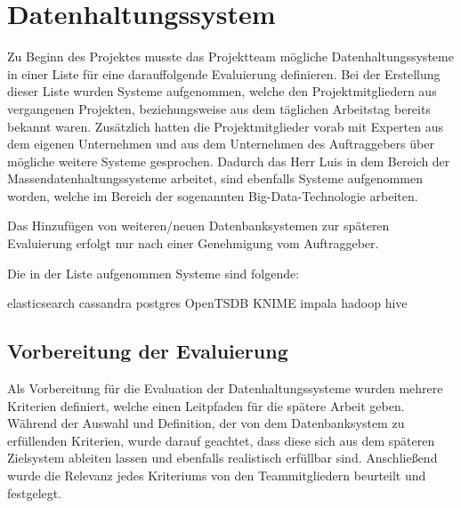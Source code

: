 \section{Datenhaltungssystem}
\label{sec:datenhaltungssystem}
Zu Beginn des Projektes musste das Projektteam mögliche Datenhaltungssysteme in
einer Liste für eine darauffolgende Evaluierung definieren. Bei der Erstellung
dieser Liste wurden Systeme aufgenommen, welche den Projektmitgliedern aus
vergangenen Projekten, beziehungsweise aus dem täglichen Arbeitstag bereits
bekannt waren. Zusätzlich hatten die Projektmitglieder vorab mit Experten aus
dem eigenen Unternehmen und aus dem Unternehmen des Auftraggebers über mögliche
weitere Systeme gesprochen. Dadurch das Herr Luis in dem Bereich der
Massendatenhaltungssysteme arbeitet, sind ebenfalls Systeme aufgenommen worden,
welche im Bereich der sogenannten Big-Data-Technologie arbeiten.

Das Hinzufügen von weiteren/neuen Datenbanksystemen zur späteren
Evaluierung erfolgt nur nach einer Genehmigung vom Auftraggeber.

Die in der Liste aufgenommen Systeme sind folgende:

\begin{outline}
  \1 elasticsearch
  \1 cassandra
  \1 postgres
  \1 OpenTSDB
  \1 KNIME
  \1 impala
  \1 hadoop
  \1 hive
\end{outline}
\nl%

\subsection{Vorbereitung der Evaluierung}
\label{subsec:DBS_vorbereitung_der_evaluierung}
Als Vorbereitung für die Evaluation der Datenhaltungssysteme wurden mehrere
Kriterien definiert, welche einen Leitpfaden für die spätere Arbeit geben.
Während der Auswahl und Definition, der von dem Datenbanksystem zu erfüllenden
Kriterien, wurde darauf geachtet, dass diese sich aus dem späteren Zielsystem
ableiten lassen und ebenfalls realistisch erfüllbar sind. Anschließend wurde
die Relevanz jedes Kriteriums von den Teammitgliedern beurteilt und festgelegt.

